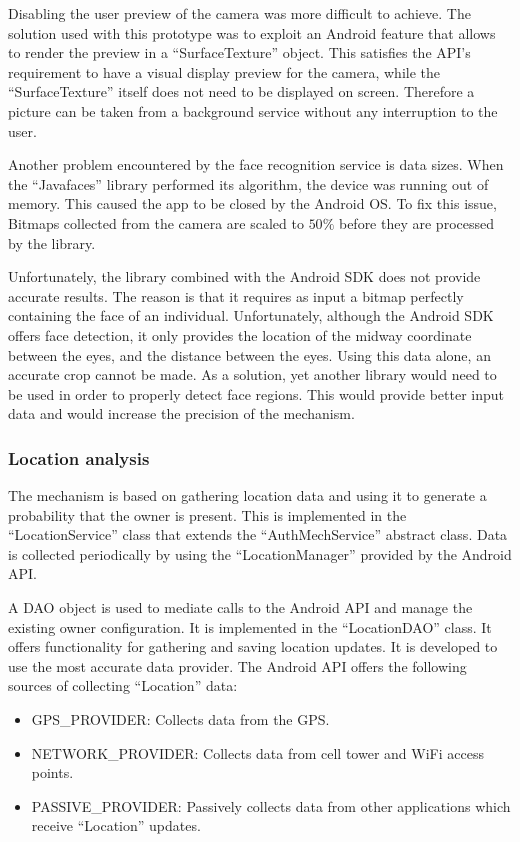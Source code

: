 Disabling the user preview of the camera was more difficult to achieve. The solution used with this prototype was to exploit an Android feature that allows to render the preview in a ``SurfaceTexture'' object. This satisfies the API's requirement to have a visual display preview for the camera, while the ``SurfaceTexture'' itself does not need to be displayed on screen. Therefore a picture can be taken from a background service without any interruption to the user.

Another problem encountered by the face recognition service is data sizes. When the ``Javafaces'' library performed its algorithm, the device was running out of memory. This caused the app to be closed by the Android OS. To fix this issue, Bitmaps collected from the camera are scaled to $50\%$ before they are processed by the library.

Unfortunately, the library combined with the Android SDK does not provide accurate results. The reason is that it requires as input a bitmap perfectly containing the face of an individual. Unfortunately, although the Android SDK offers face detection, it only provides the location of the midway coordinate between the eyes, and the distance between the eyes. Using this data alone, an accurate crop cannot be made. As a solution, yet another library would need to be used in order to properly detect face regions. This would provide better input data and would increase the precision of the mechanism.

\subsubsection{Location analysis}
The mechanism is based on gathering location data and using it to generate a probability that the owner is present. This is implemented in the ``LocationService'' class that extends the ``AuthMechService'' abstract class. Data is collected periodically by using the ``LocationManager'' provided by the Android API.

A DAO object is used to mediate calls to the Android API and manage the existing owner configuration. It is implemented in the ``LocationDAO'' class. It offers functionality for gathering and saving location updates. It is developed to use the most accurate data provider. The Android API offers the following sources of collecting ``Location'' data:
\begin{itemize}
	\item GPS\_PROVIDER: Collects data from the GPS.
	\item NETWORK\_PROVIDER: Collects data from cell tower and WiFi access points.
	\item PASSIVE\_PROVIDER: Passively collects data from other applications which receive ``Location'' updates.
\end{itemize}

